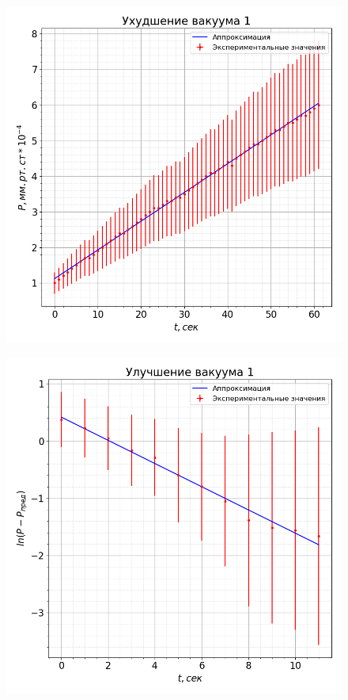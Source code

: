 \documentclass[a4paper,12pt]{article}
\begin{document}
\begin{enumerate}
        \begin{figure}[h!]
            \centering
            \begin{minipage}{0.45\textwidth}
                \centering
                \includegraphics[width=1\linewidth]{img/rise1.png}
                \label{rise1}
            \end{minipage}
            \begin{minipage}{0.45\textwidth}
                \centering
                \includegraphics[width=1\linewidth]{img/fall1.png}
                \label{fall1}
            \end{minipage}
        \end{figure}


\end{enumerate}
\end{document}
